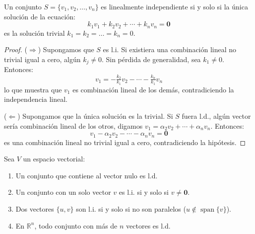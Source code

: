 \begin{theorem}
Un conjunto $S = \{v_1, v_2, \dots, v_n\}$ es linealmente independiente si y solo si la única solución de la ecuación:
$$k_1v_1 + k_2v_2 + \cdots + k_nv_n = \mathbf{0}$$
es la solución trivial $k_1 = k_2 = \dots = k_n = 0$.
\begin{proof}
($\Rightarrow$) Supongamos que $S$ es l.i. Si existiera una combinación lineal no trivial igual a cero, algún $k_j \neq 0$. Sin pérdida de generalidad, sea $k_1 \neq 0$. Entonces:
$$v_1 = -\tfrac{k_2}{k_1}v_2 - \cdots - \tfrac{k_n}{k_1}v_n$$
lo que muestra que $v_1$ es combinación lineal de los demás, contradiciendo la independencia lineal.

($\Leftarrow$) Supongamos que la única solución es la trivial. Si $S$ fuera l.d., algún vector sería combinación lineal de los otros, digamos $v_1 = \alpha_2v_2 + \cdots + \alpha_nv_n$. Entonces:
$$v_1 - \alpha_2v_2 - \cdots - \alpha_nv_n = \mathbf{0}$$
es una combinación lineal no trivial igual a cero, contradiciendo la hipótesis.
\end{proof}
\end{theorem}

\begin{coro}\label{coropropindlineal} Sea $V$ un espacio vectorial:
\begin{enumerate}[1.]
\item Un conjunto que contiene al vector nulo es l.d.
\item Un conjunto con un solo vector $v$ es l.i. si y solo si $v \neq \mathbf{0}$.
\item Dos vectores $\{u,v\}$ son l.i. si y solo si no son paralelos ($u \notin \operatorname{span}\{v\}$).
\item En $\mathbb{R}^n$, todo conjunto con más de $n$ vectores es l.d.
\end{enumerate}
\end{coro}


